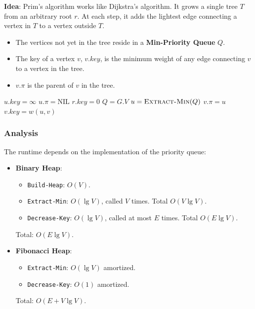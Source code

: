 \documentclass[12pt]{article}
\theoremstyle{blueplain}
\theoremstyle{bluedef}
\theoremstyle{blueremark}
\begin{document}
\textbf{Idea}: Prim's algorithm works like Dijkstra's algorithm. It grows a single tree $T$ from an arbitrary root $r$. At each step, it adds the lightest edge connecting a vertex in $T$ to a vertex outside $T$.

\begin{itemize}
    \item The vertices not yet in the tree reside in a \textbf{Min-Priority Queue} $Q$.
    \item The key of a vertex $v$, $v.key$, is the minimum weight of any edge connecting $v$ to a vertex in the tree.
    \item $v.\pi$ is the parent of $v$ in the tree.
\end{itemize}

\begin{algorithm}
    \caption{Prim's Algorithm}\label{alg:prim}
    \begin{algorithmic}[1]
        \State $u.key = \infty$
        \State $u.\pi = \text{NIL}$
        \EndFor
        \State $r.key = 0$
        \State $Q = G.V$ 
        \State $u = \Call{Extract-Min}{Q}$
        \State $v.\pi = u$
        \State $v.key = w(u, v)$
        \State {}
        \EndIf
        \EndFor
        \EndWhile
        \EndProcedure
    \end{algorithmic}
\end{algorithm}

\subsubsection{Analysis}
The runtime depends on the implementation of the priority queue:
\begin{itemize}
    \item \textbf{Binary Heap}:
          \begin{itemize}
              \item \texttt{Build-Heap}: $O(V)$.
              \item \texttt{Extract-Min}: $O(\lg V)$, called $V$ times. Total $O(V \lg V)$.
              \item \texttt{Decrease-Key}: $O(\lg V)$, called at most $E$ times. Total $O(E \lg V)$.
          \end{itemize}
          Total: $O(E \lg V)$.
    \item \textbf{Fibonacci Heap}:
          \begin{itemize}
              \item \texttt{Extract-Min}: $O(\lg V)$ amortized.
              \item \texttt{Decrease-Key}: $O(1)$ amortized.
          \end{itemize}
          Total: $O(E + V \lg V)$.
\end{itemize}
\end{document}
